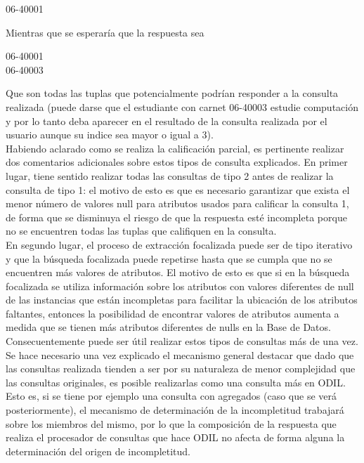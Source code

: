\begin{center}
06-40001\\
\end{center}
	Mientras que se esperaría que la respuesta sea \\

\begin{center}	
06-40001\\
06-40003\\
\end{center}


	Que son todas las tuplas que potencialmente podrían responder a la consulta realizada (puede darse que el estudiante con carnet 06-40003 estudie computación y por lo tanto deba aparecer en el resultado de la consulta realizada por el usuario aunque su indice sea mayor o igual a 3). \\

Habiendo aclarado como se realiza la calificación parcial, es pertinente realizar dos comentarios adicionales sobre estos tipos de consulta explicados. En primer lugar, tiene sentido realizar todas las consultas de tipo 2 antes de realizar la consulta de tipo 1: el motivo de esto es que es necesario garantizar que exista el menor número de valores null para atributos usados para calificar la consulta 1, de forma que se disminuya el riesgo de que la respuesta esté incompleta porque no se encuentren todas las tuplas que califiquen en la consulta. \\

	En segundo lugar, el proceso de extracción focalizada puede ser de tipo iterativo y que la búsqueda focalizada puede repetirse hasta que se cumpla que no se encuentren más valores de atributos. El motivo de esto es que si en la búsqueda focalizada se utiliza información sobre los atributos con valores diferentes de null de las instancias que están incompletas para facilitar la ubicación de los atributos faltantes, entonces la posibilidad de encontrar valores de atributos aumenta a medida que se tienen más atributos diferentes de nulls en la Base de Datos. Consecuentemente puede ser útil realizar estos tipos de consultas más de una vez. \\

Se hace necesario una vez explicado el mecanismo general destacar que dado que las consultas realizada tienden a ser por su naturaleza de menor complejidad que las consultas originales, es posible realizarlas como una consulta más en ODIL. Esto es, si se tiene por ejemplo una consulta con agregados (caso que se verá posteriormente), el mecanismo de determinación de la incompletitud trabajará sobre los miembros del mismo, por lo que la composición de la respuesta que realiza el procesador de consultas que hace ODIL no afecta de forma alguna la determinación del origen de incompletitud.\\

